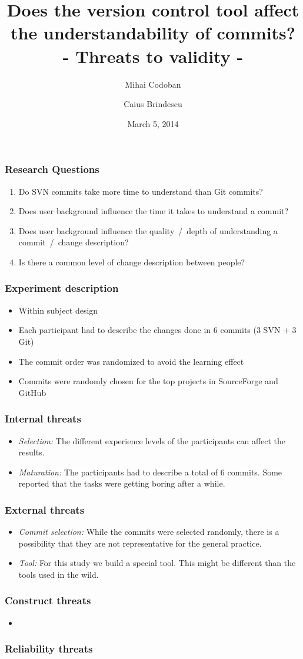 \documentclass{beamer}
\title{Does the version control tool affect the understandability of commits? \\ - Threats to validity - }
\author{Mihai Codoban \and Caius Brindescu}
\date{March 5, 2014}
\begin{document}
\begin{frame}
\titlepage
\end{frame}

\begin{frame}
\frametitle{Research Questions}
\begin{enumerate}
	\item Do SVN commits take more time to understand than Git commits?
	\item Does user background influence the time it takes to understand a commit?
	\item Does user background influence the quality~/~depth of understanding a commit~/~change description?
	\item Is there a common level of change description between people?
\end{enumerate}
\end{frame}

\begin{frame}
\frametitle{Experiment description}
\begin{itemize}
	\item Within subject design
	\item Each participant had to describe the changes done in 6 commits (3 SVN + 3 Git)
	\item The commit order was randomized to avoid the learning effect
	\item Commits were randomly chosen for the top projects in SourceForge and GitHub
\end{itemize}
\end{frame}

\begin{frame}
\frametitle{Internal threats}
\begin{itemize}
	\item{\emph{Selection:}} The different experience levels of the participants can affect the results.
	\item{\emph{Maturation:}} The participants had to describe a total of 6 commits.
	Some reported that the tasks were getting boring after a while.
\end{itemize}
\end{frame}

\begin{frame}
\frametitle{External threats}
\begin{itemize}
	\item{\emph{Commit selection:}} While the commits were selected randomly, there is a possibility that they are not representative for the general practice. 
	\item{\emph{Tool:}} For this study we build a special tool. 
	This might be different than the tools used in the wild.
\end{itemize}
\end{frame}

\begin{frame}
\frametitle{Construct threats}
\begin{itemize}
	\item
\end{itemize}
\end{frame}

\begin{frame}
\frametitle{Reliability threats}
\end{frame}
\end{document}
